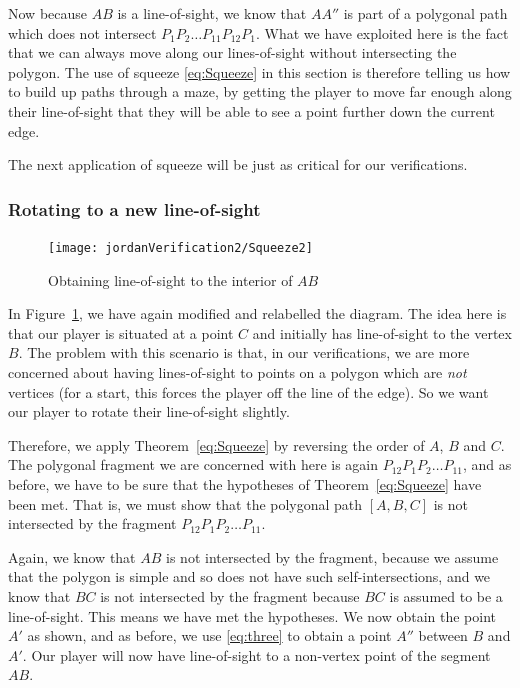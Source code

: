 Now because $AB$ is a line-of-sight, we know that $AA''$ is part of a polygonal path which does not intersect $P_1P_2\ldots P_{11}P_{12}P_{1}$. What we have exploited here is the fact that we can always move along our lines-of-sight without intersecting the polygon. The use of squeeze \eqref{eq:Squeeze} in this section is therefore telling us how to build up paths through a maze, by getting the player to move far enough along their line-of-sight that they will be able to see a point further down the current edge. 

The next application of squeeze will be just as critical for our verifications.

\subsubsection{Rotating to a new line-of-sight}\label{sec:RotateToNew}
\begin{figure}
\centering\texttt{[image: jordanVerification2/Squeeze2]}
\caption{Obtaining line-of-sight to the interior of $AB$}
\label{fig:Squeeze2}
\end{figure}
In Figure~\ref{fig:Squeeze2}, we have again modified and relabelled the diagram. The idea here is that our player is situated at a point $C$ and initially has line-of-sight to the vertex $B$. The problem with this scenario is that, in our verifications, we are more concerned about having lines-of-sight to points on a polygon which are \emph{not} vertices (for a start, this forces the player off the line of the edge).  So we want our player to rotate their line-of-sight slightly. 

Therefore, we apply Theorem~\ref{eq:Squeeze} by reversing the order of $A$, $B$ and $C$. The polygonal fragment we are concerned with here is again $P_{12}P_1P_2\ldots P_{11}$, and as before, we have to be sure that the hypotheses of Theorem~\ref{eq:Squeeze} have been met. That is, we must show that the polygonal path $[A,B,C]$ is not intersected by the fragment $P_{12}P_1P_2\ldots P_{11}$. 

Again, we know that $AB$ is not intersected by the fragment, because we assume that the polygon is simple and so does not have such self-intersections, and we know that $BC$ is not intersected by the fragment because $BC$ is assumed to be a line-of-sight. This means we have met the hypotheses. We now obtain the point $A'$ as shown, and as before, we use \ref{eq:three} to obtain a point $A''$ between $B$ and $A'$. Our player will now have line-of-sight to a non-vertex point of the segment $AB$.

